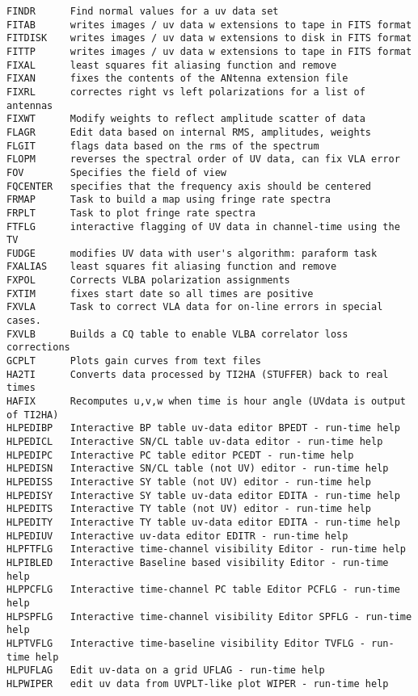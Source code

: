\begin{verbatim}
FINDR      Find normal values for a uv data set
FITAB      writes images / uv data w extensions to tape in FITS format
FITDISK    writes images / uv data w extensions to disk in FITS format
FITTP      writes images / uv data w extensions to tape in FITS format
FIXAL      least squares fit aliasing function and remove
FIXAN      fixes the contents of the ANtenna extension file
FIXRL      correctes right vs left polarizations for a list of antennas
FIXWT      Modify weights to reflect amplitude scatter of data
FLAGR      Edit data based on internal RMS, amplitudes, weights
FLGIT      flags data based on the rms of the spectrum
FLOPM      reverses the spectral order of UV data, can fix VLA error
FOV        Specifies the field of view
FQCENTER   specifies that the frequency axis should be centered
FRMAP      Task to build a map using fringe rate spectra
FRPLT      Task to plot fringe rate spectra
FTFLG      interactive flagging of UV data in channel-time using the TV
FUDGE      modifies UV data with user's algorithm: paraform task
FXALIAS    least squares fit aliasing function and remove
FXPOL      Corrects VLBA polarization assignments
FXTIM      fixes start date so all times are positive
FXVLA      Task to correct VLA data for on-line errors in special cases.
FXVLB      Builds a CQ table to enable VLBA correlator loss corrections
GCPLT      Plots gain curves from text files
HA2TI      Converts data processed by TI2HA (STUFFER) back to real times
HAFIX      Recomputes u,v,w when time is hour angle (UVdata is output of TI2HA)
HLPEDIBP   Interactive BP table uv-data editor BPEDT - run-time help
HLPEDICL   Interactive SN/CL table uv-data editor - run-time help
HLPEDIPC   Interactive PC table editor PCEDT - run-time help
HLPEDISN   Interactive SN/CL table (not UV) editor - run-time help
HLPEDISS   Interactive SY table (not UV) editor - run-time help
HLPEDISY   Interactive SY table uv-data editor EDITA - run-time help
HLPEDITS   Interactive TY table (not UV) editor - run-time help
HLPEDITY   Interactive TY table uv-data editor EDITA - run-time help
HLPEDIUV   Interactive uv-data editor EDITR - run-time help
HLPFTFLG   Interactive time-channel visibility Editor - run-time help
HLPIBLED   Interactive Baseline based visibility Editor - run-time help
HLPPCFLG   Interactive time-channel PC table Editor PCFLG - run-time help
HLPSPFLG   Interactive time-channel visibility Editor SPFLG - run-time help
HLPTVFLG   Interactive time-baseline visibility Editor TVFLG - run-time help
HLPUFLAG   Edit uv-data on a grid UFLAG - run-time help
HLPWIPER   edit uv data from UVPLT-like plot WIPER - run-time help

\end{verbatim}
